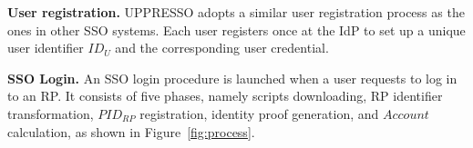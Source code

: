 \noindent\textbf{User registration.} UPPRESSO adopts a similar user registration process as the ones in other SSO systems. Each user registers once at the IdP to set up a unique user identifier $ID_U$ and the corresponding user credential.

\noindent\textbf{SSO Login.} An SSO login procedure is launched when a user requests to log in to an RP.
It consists of five phases, namely scripts downloading, RP identifier transformation, $PID_{RP}$ registration, identity proof generation, and $Account$ calculation, as shown in Figure~\ref{fig:process}.

